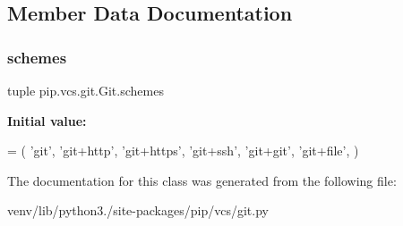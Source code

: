 \subsection{Member Data Documentation}
\mbox{\label{classpip_1_1vcs_1_1git_1_1_git_a5a817215e88aafc7cf7ceeb666189b92}} 
\subsubsection{\texorpdfstring{schemes}{schemes}}
{\footnotesize\ttfamily tuple pip.\+vcs.\+git.\+Git.\+schemes\hspace{0.3cm}{\ttfamily [static]}}

{\bfseries Initial value\+:}
\begin{DoxyCode}
=  (
        \textcolor{stringliteral}{'git'}, \textcolor{stringliteral}{'git+http'}, \textcolor{stringliteral}{'git+https'}, \textcolor{stringliteral}{'git+ssh'}, \textcolor{stringliteral}{'git+git'}, \textcolor{stringliteral}{'git+file'},
    )
\end{DoxyCode}


The documentation for this class was generated from the following file\+:\begin{DoxyCompactItemize}
\item 
venv/lib/python3./site-\/packages/pip/vcs/git.\+py\end{DoxyCompactItemize}
